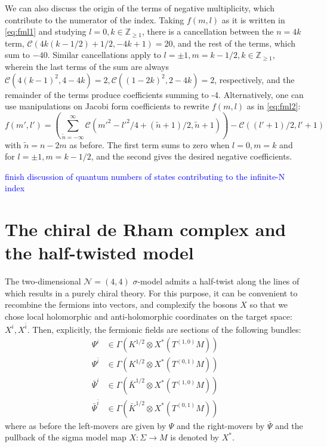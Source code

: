 \documentclass[11pt]{amsart}
\newcommand{\cN}{\mathcal{N}}
\theoremstyle{thm}
\numberwithin{equation}{subsection}
\theoremstyle{def}
\theoremstyle{rem}
\begin{document}
We can also discuss the origin of the terms of negative multiplicity, which contribute to the numerator of the index. Taking $f(m,l)$ as it is written in \ref{eq:fml1} and studying $l=0, k \in \mathbb{Z}_{\geq 1}$, there is a cancellation between the $n=4k$ term, $\mathcal{C}(4k(k-1/2) + 1/2,-4k+1)=20$, and the rest of the terms, which sum to $-40$. Similar cancellations apply to $l=\pm 1, m = k-1/2, k \in \mathbb{Z}_{\geq 1}$, wherein the last terms of the sum are always $\mathcal{C}(4(k-1)^2, 4-4k) = 2, \mathcal{C}((1-2k)^2, 2-4k) = 2$, respectively, and the remainder of the terms produce coefficients summing to -4. Alternatively, one can use manipulations on Jacobi form coefficients to rewrite $f(m, l)$ as in \ref{eq:fml2}:
\begin{equation}
f(m', l') =\left(\sum_{\tilde{n}= - \infty}^{\infty}\mathcal{C}(m'^2 - l'^2/4 + (\tilde{n} + 1)/2, \tilde{n} + 1) \right) - \mathcal{C}((l' + 1)/2, l' + 1)
\end{equation} with $\tilde{n} = n-2m$ as before. The first term sums to zero when $l=0, m= k$ and for $l=\pm 1, m = k-1/2$, and the second gives the desired negative coefficients.


\textcolor{blue}{finish discussion of quantum numbers of states contributing to the infinite-N index}




\section{The chiral de Rham complex and the half-twisted model}

The two-dimensional $\cN=(4,4)$ $\sigma$-model admits a half-twist along the lines of \cite{Kapustin, Witten} which results in a purely chiral theory.
For this purpose, it can be convenient to recombine the fermions into vectors, and complexify the bosons $X$ so that we chose local holomorphic and anti-holomorphic coordinates on the target space: $X^i, X^{\bar{i}}$. 
Then, explicitly, the fermionic fields are sections of the following bundles: 
\begin{align*}
\Psi^i &\in \Gamma(K^{1/2}\otimes X^*(T^{(1,0)}M))\\
\Psi^{\bar{i}}&\in \Gamma(K^{1/2}\otimes X^*(T^{(0,1)}M))\\
\bar{\Psi}^{i} &\in \Gamma(\bar{K}^{1/2}\otimes X^*(T^{(1,0)}M))\\
\bar{\Psi}^{\bar{i}} &\in \Gamma(\bar{K}^{1/2}\otimes X^*(T^{(0,1)}M))
\end{align*}  
where as before the left-movers are given by $\Psi$ and the right-movers by $\bar{\Psi}$ and the pullback of the sigma model map $X \colon \Sigma \rightarrow M$ is denoted by $X^*$.
\end{document}
